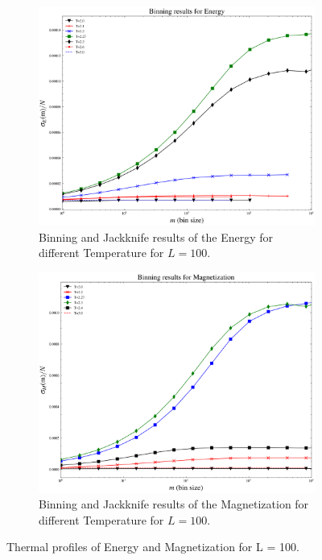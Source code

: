 \documentclass[article]{revtex4}
\begin{document}
\begin{figure}[h!]
\begin{subfigure}{.5\textwidth}
  \centering
  \includegraphics[width=0.8\linewidth]{sigmaE_vs_m.png}
  \caption{Binning and Jackknife results of the Energy for different Temperature for $L=100$.}
\end{subfigure}%
\begin{subfigure}{.5\textwidth}
  \centering
  \includegraphics[width=0.8\linewidth]{sigmaM_vs_m.png}
  \caption{Binning and Jackknife results of the Magnetization for different Temperature for $L=100$.}
\end{subfigure}
\caption{Thermal profiles of Energy and Magnetization for L = 100.}
\end{figure}
\newpage
\end{document}
